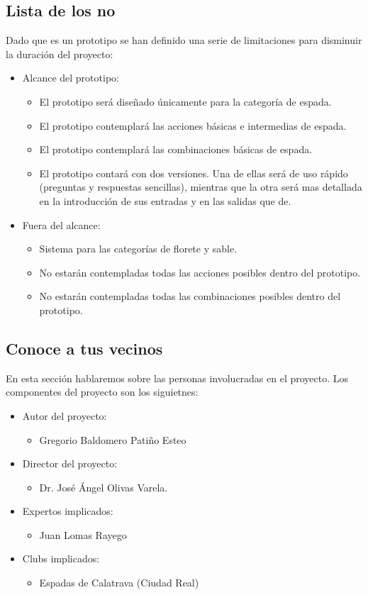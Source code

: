 \subsection{Lista de los no}
Dado que es un prototipo se han definido una serie de limitaciones para disminuir la duración
del proyecto:
\begin{itemize}
  \item Alcance del prototipo:
    \begin{itemize}
      \item El prototipo será diseñado únicamente para la categoría de espada.
      \item El prototipo contemplará las acciones básicas e intermedias de espada.
      \item El prototipo contemplará las combinaciones básicas de espada.
      \item El prototipo contará con dos versiones. Una de ellas será de uso rápido
        (preguntas y respuestas sencillas), mientras que la otra será mas detallada
        en la introducción de sus entradas y en las salidas que de.
    \end{itemize}
  \item Fuera del alcance:
    \begin{itemize}
      \item Sistema para las categorías de florete y sable.
      \item No estarán contempladas todas las acciones posibles dentro del prototipo.
      \item No estarán contempladas todas las combinaciones posibles dentro del prototipo.
    \end{itemize}
\end{itemize}

\subsection{Conoce a tus vecinos}
En esta sección hablaremos sobre las personas involucradas en el proyecto. Los componentes
del proyecto son los siguietnes:
\begin{itemize}
  \item Autor del proyecto:
    \begin{itemize}
      \item Gregorio Baldomero Patiño Esteo
    \end{itemize}
  \item Director del proyecto:
    \begin{itemize}
      \item Dr. José Ángel Olivas Varela.
    \end{itemize}
  \item Expertos implicados:
    \begin{itemize}
      \item Juan Lomas Rayego
    \end{itemize}
  \item Clubs implicados:
    \begin{itemize}
      \item Espadas de Calatrava (Ciudad Real)
    \end{itemize}
\end{itemize}

